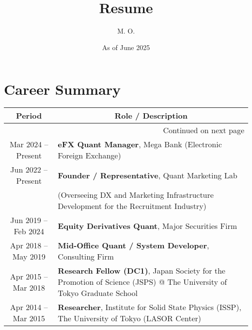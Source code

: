 \documentclass[uplatex,a4j,10.5pt,dvipdfmx]{jsarticle}
\title{\ \\[-20mm] \sffamily \bfseries Resume}
\author{M. O.}
\date{As of June 2025}
\begin{document}
\maketitle

\section{Career Summary}

\begin{longtable}{|c|p{14cm}|}
	\hline
	\multicolumn{1}{|c|}{\textbf{Period}} & \multicolumn{1}{c|}{\textbf{Role / Description}}                                                                            \\
	\hline
	\endhead
	\hline
	\multicolumn{2}{r}{{Continued on next page}}                                                                                                                        \\
	\endfoot
	\hline
	\endlastfoot

	Mar 2024 -- Present                   & \textbf{eFX Quant Manager}, Mega Bank (Electronic Foreign Exchange)                                                         \\
	\hline
	Jun 2022 -- Present                   & \textbf{Founder / Representative}, Quant Marketing Lab                                                                      \\
	                                      & (Overseeing DX and Marketing Infrastructure Development for the Recruitment Industry)                                       \\
	\hline
	Jun 2019 -- Feb 2024                  & \textbf{Equity Derivatives Quant}, Major Securities Firm                                                                    \\
	\hline
	Apr 2018 -- May 2019                  & \textbf{Mid-Office Quant / System Developer}, Consulting Firm                                                               \\
	\hline
	Apr 2015 -- Mar 2018                  & \textbf{Research Fellow (DC1)}, Japan Society for the Promotion of Science (JSPS) @ The University of Tokyo Graduate School \\
	\hline
	Apr 2014 -- Mar 2015                  & \textbf{Researcher}, Institute for Solid State Physics (ISSP), The University of Tokyo (LASOR Center)                       \\
	\hline
\end{longtable}
\end{document}
